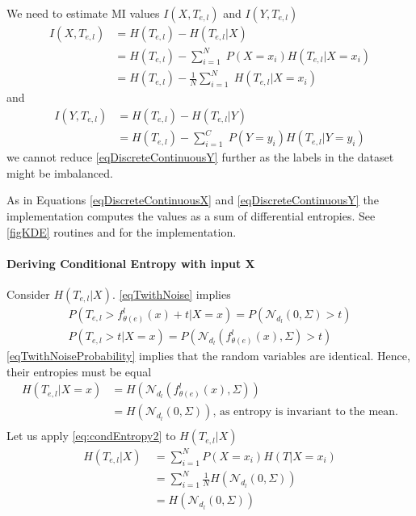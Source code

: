 \documentclass[dissertation.tex]{subfiles}
\begin{document}
We need to estimate MI values $I(X, T_{e,l})$ and $I(Y, T_{e,l})$
\begin{align}
  I(X, T_{e,l})&=H(T_{e,l})-H(T_{e,l}|X) 
  \nonumber\\&=
  H(T_{e,l})-\sum_{i=1}^N\;P(X=x_i)H(T_{e,l}|X=x_i)
  \nonumber\\&=
  H(T_{e,l})-\frac{1}{N}\sum_{i=1}^N\;H(T_{e,l}|X=x_i)
  \label{eqDiscreteContinuousX}
\end{align}
and
\begin{align}
  I(Y, T_{e,l})&=H(T_{e,l})-H(T_{e,l}|Y) 
  \nonumber\\&=
  H(T_{e,l})-\sum_{i=1}^C\;P(Y=y_i)H(T_{e,l}|Y=y_i)
  \label{eqDiscreteContinuousY}
\end{align}
we cannot reduce \autoref{eqDiscreteContinuousY} further as the labels in
the dataset might be imbalanced.

As in Equations \ref{eqDiscreteContinuousX} and \ref{eqDiscreteContinuousY} the
implementation computes the values as a sum of differential entropies. See
\autoref{figKDE} routines  and  for the
implementation.

\paragraph{Deriving Conditional Entropy with input X}

Consider $H(T_{e,l}|X)$. \autoref{eqTwithNoise} implies
\begin{gather}
  P(T_{e,l} > f_{\theta(e)}^l(x) + t | X = x)
  =
  P(\mathcal{N}_{d_l}(0, \Sigma) > t)\\
  P(T_{e,l} > t | X = x)
  =
  P(\mathcal{N}_{d_l}(f_{\theta(e)}^l(x) , \Sigma) > t)
  \label{eqTwithNoiseProbability}
\end{gather}
\autoref{eqTwithNoiseProbability} implies that the random variables are
identical. Hence, their entropies must be equal
\begin{align}
  H(T_{e,l}|X=x)
  &=
  H(\mathcal{N}_{d_l}(f_{\theta(e)}^l(x), \Sigma))\\
  &=
  H(\mathcal{N}_{d_l}(0, \Sigma))
  \text{, as entropy is invariant to the mean.}
  \\
  \label{eqEqualToGaussianEntropy}
\end{align}
Let us apply \autoref{eq:condEntropy2} to $H(T_{e,l}|X)$
\begin{align}
  H(T_{e,l}|X)\ &=\sum _{i=1}^NP(X=x_i)H(T|X=x_i)\\
  &=\sum _{i=1}^N\frac{1}{N}H(\mathcal{N}_{d_l}(0, \Sigma))\\
  &=H(\mathcal{N}_{d_l}(0, \Sigma))
\end{align}
\end{document}
